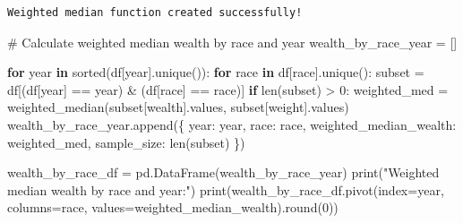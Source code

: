 \documentclass[
  letterpaper,
  DIV=11,
  numbers=noendperiod]{scrartcl}
\newenvironment{Shaded}{\begin{snugshade}}{\end{snugshade}}
\newcommand{\BuiltInTok}[1]{\textcolor[rgb]{0.00,0.23,0.31}{#1}}
\newcommand{\CommentTok}[1]{\textcolor[rgb]{0.37,0.37,0.37}{#1}}
\newcommand{\ControlFlowTok}[1]{\textcolor[rgb]{0.00,0.23,0.31}{\textbf{#1}}}
\newcommand{\DecValTok}[1]{\textcolor[rgb]{0.68,0.00,0.00}{#1}}
\newcommand{\KeywordTok}[1]{\textcolor[rgb]{0.00,0.23,0.31}{\textbf{#1}}}
\newcommand{\NormalTok}[1]{\textcolor[rgb]{0.00,0.23,0.31}{#1}}
\newcommand{\OperatorTok}[1]{\textcolor[rgb]{0.37,0.37,0.37}{#1}}
\newcommand{\StringTok}[1]{\textcolor[rgb]{0.13,0.47,0.30}{#1}}
\begin{document}
\begin{verbatim}
Weighted median function created successfully!
\end{verbatim}

\begin{Shaded}
\begin{Highlighting}[]
\CommentTok{\# Calculate weighted median wealth by race and year}
\NormalTok{wealth\_by\_race\_year }\OperatorTok{=}\NormalTok{ []}

\ControlFlowTok{for}\NormalTok{ year }\KeywordTok{in} \BuiltInTok{sorted}\NormalTok{(df[}\StringTok{\textquotesingle{}year\textquotesingle{}}\NormalTok{].unique()):}
    \ControlFlowTok{for}\NormalTok{ race }\KeywordTok{in}\NormalTok{ df[}\StringTok{\textquotesingle{}race\textquotesingle{}}\NormalTok{].unique():}
\NormalTok{        subset }\OperatorTok{=}\NormalTok{ df[(df[}\StringTok{\textquotesingle{}year\textquotesingle{}}\NormalTok{] }\OperatorTok{==}\NormalTok{ year) }\OperatorTok{\&}\NormalTok{ (df[}\StringTok{\textquotesingle{}race\textquotesingle{}}\NormalTok{] }\OperatorTok{==}\NormalTok{ race)]}
        \ControlFlowTok{if} \BuiltInTok{len}\NormalTok{(subset) }\OperatorTok{\textgreater{}} \DecValTok{0}\NormalTok{:}
\NormalTok{            weighted\_med }\OperatorTok{=}\NormalTok{ weighted\_median(subset[}\StringTok{\textquotesingle{}wealth\textquotesingle{}}\NormalTok{].values, subset[}\StringTok{\textquotesingle{}weight\textquotesingle{}}\NormalTok{].values)}
\NormalTok{            wealth\_by\_race\_year.append(\{}
                \StringTok{\textquotesingle{}year\textquotesingle{}}\NormalTok{: year,}
                \StringTok{\textquotesingle{}race\textquotesingle{}}\NormalTok{: race,}
                \StringTok{\textquotesingle{}weighted\_median\_wealth\textquotesingle{}}\NormalTok{: weighted\_med,}
                \StringTok{\textquotesingle{}sample\_size\textquotesingle{}}\NormalTok{: }\BuiltInTok{len}\NormalTok{(subset)}
\NormalTok{            \})}

\NormalTok{wealth\_by\_race\_df }\OperatorTok{=}\NormalTok{ pd.DataFrame(wealth\_by\_race\_year)}
\BuiltInTok{print}\NormalTok{(}\StringTok{"Weighted median wealth by race and year:"}\NormalTok{)}
\BuiltInTok{print}\NormalTok{(wealth\_by\_race\_df.pivot(index}\OperatorTok{=}\StringTok{\textquotesingle{}year\textquotesingle{}}\NormalTok{, columns}\OperatorTok{=}\StringTok{\textquotesingle{}race\textquotesingle{}}\NormalTok{, values}\OperatorTok{=}\StringTok{\textquotesingle{}weighted\_median\_wealth\textquotesingle{}}\NormalTok{).}\BuiltInTok{round}\NormalTok{(}\DecValTok{0}\NormalTok{))}
\end{Highlighting}
\end{Shaded}
\end{document}
